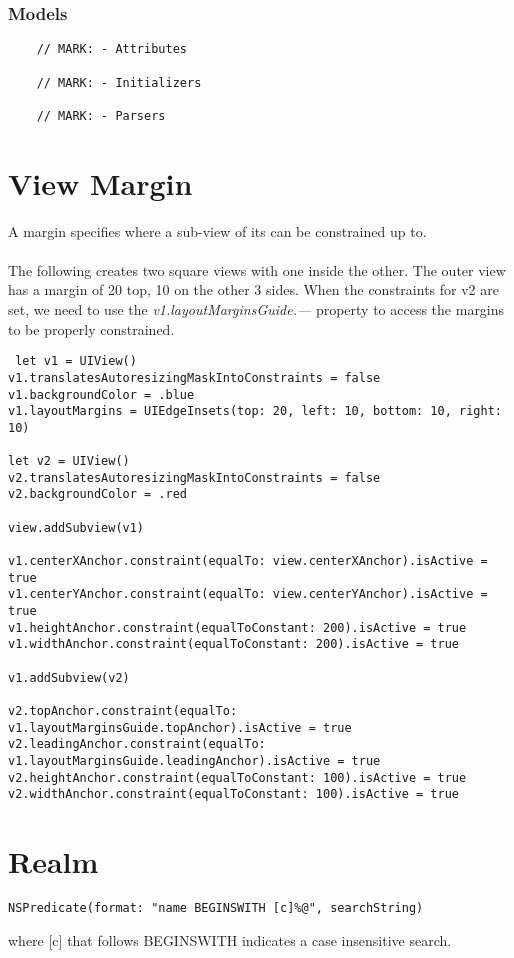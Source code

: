 \documentclass[]{article}
\newcommand{\<}{\guilsinglleft}
\renewcommand{\>}{\guilsinglright}
\renewcommand{\it}[1]{\textit{#1}}
\begin{document}
\subsubsection{Models}
\begin{lstlisting}
	// MARK: - Attributes
	
	// MARK: - Initializers
	
	// MARK: - Parsers
\end{lstlisting}
\cite{medium-ios-code-snipets}

\section{View Margin}
A margin specifies where a sub-view of its can be constrained up to.
\\\\
The following creates two square views with one inside the other.  The outer view has a margin of 20 top, 10 on the other 3 sides.  When the constraints for v2 are set, we need to use the \it{v1.layoutMarginsGuide.---} property to access the margins to be properly constrained. \cite[pp.42]{Programming-iOS10}
\begin{lstlisting}
 let v1 = UIView()
v1.translatesAutoresizingMaskIntoConstraints = false
v1.backgroundColor = .blue
v1.layoutMargins = UIEdgeInsets(top: 20, left: 10, bottom: 10, right: 10)

let v2 = UIView()
v2.translatesAutoresizingMaskIntoConstraints = false
v2.backgroundColor = .red

view.addSubview(v1)

v1.centerXAnchor.constraint(equalTo: view.centerXAnchor).isActive = true
v1.centerYAnchor.constraint(equalTo: view.centerYAnchor).isActive = true
v1.heightAnchor.constraint(equalToConstant: 200).isActive = true
v1.widthAnchor.constraint(equalToConstant: 200).isActive = true

v1.addSubview(v2)

v2.topAnchor.constraint(equalTo: v1.layoutMarginsGuide.topAnchor).isActive = true
v2.leadingAnchor.constraint(equalTo: v1.layoutMarginsGuide.leadingAnchor).isActive = true
v2.heightAnchor.constraint(equalToConstant: 100).isActive = true
v2.widthAnchor.constraint(equalToConstant: 100).isActive = true
\end{lstlisting}

\section{Realm}
\begin{lstlisting}
NSPredicate(format: "name BEGINSWITH [c]%@", searchString)
\end{lstlisting}
where [c] that follows BEGINSWITH indicates a case insensitive search.
\end{document}
